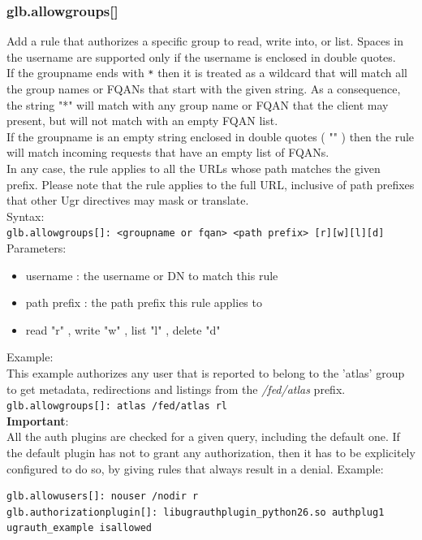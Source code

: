 \documentclass[12pt]{article} %
\begin{document}
\subsubsection{glb.allowgroups[]}
Add a rule that authorizes a specific group to read, write into, or list. Spaces in the username are supported only if the username is enclosed in double quotes.\\
If the groupname ends with \lstinline"*" then it is treated as a wildcard that will match all the group names or FQANs that start with the given string. As a consequence, the
string "*" will match with any group name or FQAN that the client may present, but will not match with an empty FQAN list.\\
If the groupname is an empty string enclosed in double quotes ( "" ) then the rule will match incoming requests that have an empty list of FQANs.\\
In any case, the rule applies to all the URLs whose path matches the given prefix. Please note that the rule applies to the full URL, inclusive of path prefixes that other Ugr directives may mask or translate.\\
Syntax:\\
\lstinline"glb.allowgroups[]: <groupname or fqan> <path prefix> [r][w][l][d]" \\

Parameters:\\
\begin{itemize}
 \item username : the username or DN to match this rule
 \item path prefix : the path prefix this rule applies to
 \item read "r" , write "w" , list "l" , delete "d"
\end{itemize}

Example:\\
This example authorizes any user that is reported to belong to the 'atlas' group to get metadata, redirections and listings from
the \textit{/fed/atlas} prefix.\\
\lstinline"glb.allowgroups[]: atlas /fed/atlas rl" \\


\textbf{Important}:\\ All the auth plugins are checked for a given query, including the default one. If the default plugin has not to grant any authorization, then it has to
be explicitely configured to do so, by giving rules that always result in a denial. Example:\\
\begin{lstlisting}
glb.allowusers[]: nouser /nodir r
glb.authorizationplugin[]: libugrauthplugin_python26.so authplug1 ugrauth_example isallowed
\end{lstlisting}
\end{document}
